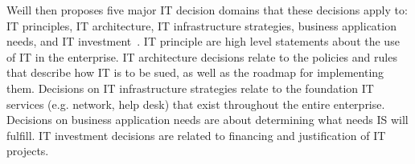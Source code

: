 Weill then proposes five major IT decision domains that these decisions apply to: IT principles, IT architecture, IT infrastructure strategies, business application needs, and IT investment~\cite{Weill2004}. IT principle are high level statements about the use of IT in the enterprise. IT architecture decisions relate to the policies and rules that describe how IT is to be sued, as well as the roadmap for implementing them. Decisions on IT infrastructure strategies relate to the foundation IT services (e.g. network, help desk) that exist throughout the entire enterprise.  Decisions on business application needs are about determining what needs IS will fulfill. IT investment decisions are related to financing and justification of IT projects.

